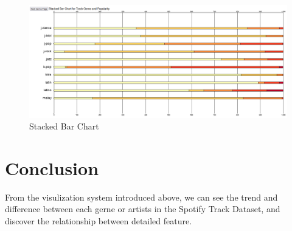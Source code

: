 \documentclass[a4paper, oneside, final, 12pt]{scrartcl} %
\begin{document}
\begin{figure}[ht]
  \includegraphics[width=\textwidth]{Images/stacked_bar_chart.png}
  \caption{Stacked Bar Chart}
  \label{fig: stacked}
\end{figure}

\section{Conclusion}

From the visulization system introduced above, 
we can see the trend and difference between each gerne or artists in the Spotify Track Dataset,
and discover the relationship between detailed feature.

\end{document}
